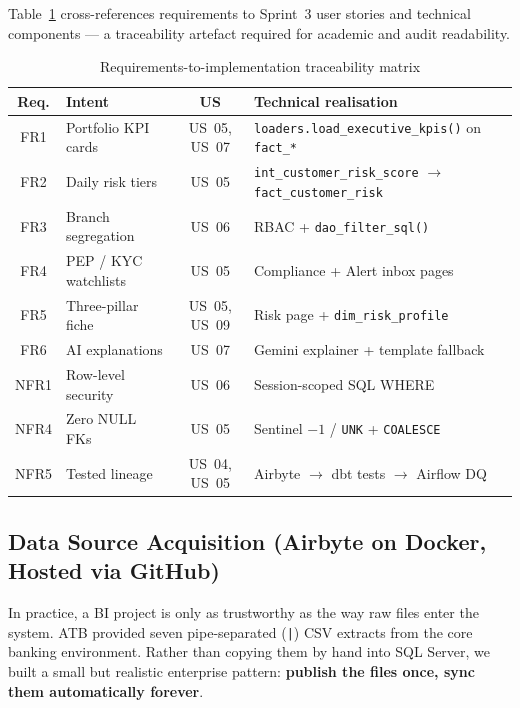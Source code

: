 Table~\ref{tab:fr_nfr_traceability} cross-references requirements to Sprint~3
user stories and technical components --- a traceability artefact required for
academic and audit readability.

\begin{table}[H]
\centering
\caption{Requirements-to-implementation traceability matrix}
\label{tab:fr_nfr_traceability}
\renewcommand{\arraystretch}{1.2}
\scriptsize
\begin{tabular}{|c|p{4.2cm}|c|p{5.5cm}|}
\hline
\rowcolor{blue!15}
\textbf{Req.} & \textbf{Intent} & \textbf{US} & \textbf{Technical realisation} \\
\hline
FR1 & Portfolio KPI cards & US~05, US~07 & \texttt{loaders.load\_executive\_kpis()} on \texttt{fact\_*} \\
\hline
FR2 & Daily risk tiers & US~05 & \texttt{int\_customer\_risk\_score} $\rightarrow$ \texttt{fact\_customer\_risk} \\
\hline
FR3 & Branch segregation & US~06 & RBAC + \texttt{dao\_filter\_sql()} \\
\hline
FR4 & PEP / KYC watchlists & US~05 & Compliance + Alert inbox pages \\
\hline
FR5 & Three-pillar fiche & US~05, US~09 & Risk page + \texttt{dim\_risk\_profile} \\
\hline
FR6 & AI explanations & US~07 & Gemini explainer + template fallback \\
\hline
NFR1 & Row-level security & US~06 & Session-scoped SQL WHERE \\
\hline
NFR4 & Zero NULL FKs & US~05 & Sentinel $-1$ / \texttt{UNK} + \texttt{COALESCE} \\
\hline
NFR5 & Tested lineage & US~04, US~05 & Airbyte $\rightarrow$ dbt tests $\rightarrow$ Airflow DQ \\
\hline
\end{tabular}
\end{table}

\subsection{Data Source Acquisition (Airbyte on Docker, Hosted via GitHub)}
In practice, a BI project is only as trustworthy as the way raw files enter the
system. ATB provided seven pipe-separated (\texttt{|}) CSV extracts from the core
banking environment. Rather than copying them by hand into SQL Server, we built
a small but realistic enterprise pattern: \textbf{publish the files once, sync
them automatically forever}.

